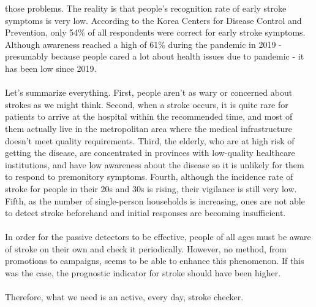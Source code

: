 \begin{itemize}
those problems. The reality is that people's recognition rate of early stroke symptoms is very low. \cite{r11} According to the Korea Centers for Disease Control and Prevention, only 54\% of all respondents were correct for early stroke symptoms. Although awareness reached a high of 61\% during the pandemic in 2019 - presumably because people cared a lot about health issues due to pandemic - it has been low since 2019.\\ \\Let's summarize everything. First, people aren't as wary or concerned about strokes as we might think. Second, when a stroke occurs, it is quite rare for patients to arrive at the hospital within the recommended time, and most of them actually live in the metropolitan area where the medical infrastructure doesn't meet quality requirements. Third, the elderly, who are at high risk of getting the disease, are concentrated in provinces with low-quality healthcare institutions, and have low awareness about the disease so it is unlikely for them to respond to premonitory symptoms. Fourth, although the incidence rate of stroke for people in their 20s and 30s is rising, their vigilance is still very low. Fifth, as the number of single-person households is increasing, ones are not able to detect stroke beforehand and initial responses are becoming insufficient.\\ \\In order for the passive detectors to be effective, people of all ages must be aware of stroke on their own and check it periodically. However, no method, from promotions to campaigns, seems to be able to enhance this phenomenon. If this was the case, \cite{r12} the prognostic indicator for stroke should have been higher.\\ \\Therefore, what we need is an active, every day, stroke checker.\\
\end{itemize}
